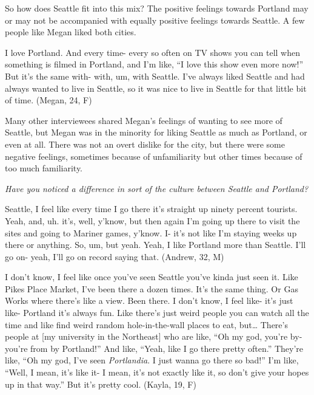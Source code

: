 So how does Seattle fit into this mix? The positive feelings towards Portland may or may not be accompanied with equally positive feelings towards Seattle. A few people like Megan liked both cities.
\begin{num_quote}
    I love Portland. And every time- every so often on TV shows you can tell when something is filmed in Portland, and I'm like, ``I love this show even more now!'' But it's the same with- with, um, with Seattle. I've always liked Seattle and had always wanted to live in Seattle, so it was nice to live in Seattle for that little bit of time. (Megan, 24, F)
    \label{quote:i_like_both}
\end{num_quote}
Many other interviewees shared Megan's feelings of wanting to see more of Seattle, but Megan was in the minority for liking Seattle as much as Portland, or even at all. There was not an overt dislike for the city, but there were some negative feelings, sometimes because of unfamiliarity but other times because of too much familiarity.
\begin{num_quote}
    \textit{Have you noticed a difference in sort of the culture between Seattle and Portland?}

    Seattle, I feel like every time I go there it's straight up ninety percent tourists. Yeah, and, uh. it's, well, y'know, but then again I'm going up there to visit the sites and going to Mariner games, y'know. I- it's not like I'm staying weeks up there or anything. So, um, but yeah. Yeah, I like Portland more than Seattle. I'll go on- yeah, I'll go on record saying that. (Andrew, 32, M)
    \label{quote:seattle_tourists}
\end{num_quote}
\begin{num_quote}
    I don't know, I feel like once you've seen Seattle you've kinda just seen it. Like Pikes Place Market, I've been there a dozen times. It's the same thing. Or Gas Works where there's like a view. Been there. I don't know, I feel like- it's just like- Portland it's always fun. Like there's just weird people you can watch all the time and like find weird random hole-in-the-wall places to eat, but… There's people at [my university in the Northeast] who are like, ``Oh my god, you're by- you're from by Portland!'' And like, ``Yeah, like I go there pretty often.'' They're like, ``Oh my god, I've seen \textit{Portlandia}. I just wanna go there so bad!'' I'm like, ``Well, I mean, it's like it- I mean, it's not exactly like it, so don't give your hopes up in that way.'' But it's pretty cool. (Kayla, 19, F)
    \label{quote:its_the_same_thing}
\end{num_quote}
